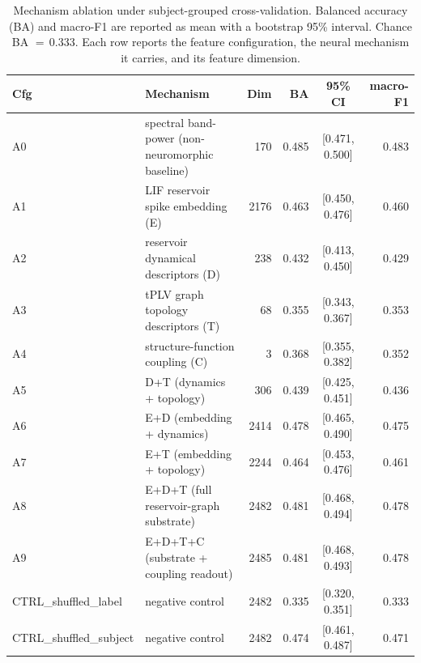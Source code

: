\begin{table}[t]
\centering
\footnotesize
\caption{Mechanism ablation under subject-grouped cross-validation. Balanced accuracy (BA) and macro-F1 are reported as mean with a bootstrap 95\% interval. Chance BA $=\,0.333$. Each row reports the feature configuration, the neural mechanism it carries, and its feature dimension.}
\label{tab:mechanism_ablation}
\begin{tabular}{l p{6.2cm} r r c r}
\toprule
Cfg & Mechanism & Dim & BA & 95\% CI & macro-F1 \\
\midrule
A0 & spectral band-power (non-neuromorphic baseline) & 170 & 0.485 & [0.471, 0.500] & 0.483 \\
A1 & LIF reservoir spike embedding (E) & 2176 & 0.463 & [0.450, 0.476] & 0.460 \\
A2 & reservoir dynamical descriptors (D) & 238 & 0.432 & [0.413, 0.450] & 0.429 \\
A3 & tPLV graph topology descriptors (T) & 68 & 0.355 & [0.343, 0.367] & 0.353 \\
A4 & structure-function coupling (C) & 3 & 0.368 & [0.355, 0.382] & 0.352 \\
A5 & D+T (dynamics + topology) & 306 & 0.439 & [0.425, 0.451] & 0.436 \\
A6 & E+D (embedding + dynamics) & 2414 & 0.478 & [0.465, 0.490] & 0.475 \\
A7 & E+T (embedding + topology) & 2244 & 0.464 & [0.453, 0.476] & 0.461 \\
A8 & E+D+T (full reservoir-graph substrate) & 2482 & 0.481 & [0.468, 0.494] & 0.478 \\
A9 & E+D+T+C (substrate + coupling readout) & 2485 & 0.481 & [0.468, 0.493] & 0.478 \\
CTRL\_shuffled\_label & negative control & 2482 & 0.335 & [0.320, 0.351] & 0.333 \\
CTRL\_shuffled\_subject & negative control & 2482 & 0.474 & [0.461, 0.487] & 0.471 \\
\bottomrule
\end{tabular}
\end{table}
